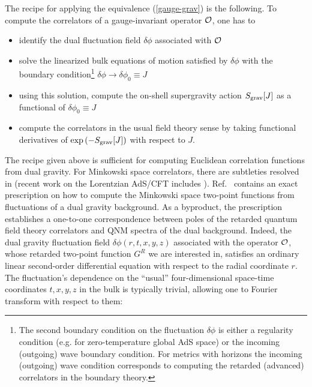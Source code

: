 \documentclass[]{iopart}
\begin{document}
The recipe for applying the equivalence (\ref{gauge-grav}) is the following.
To compute the correlators of a gauge-invariant operator ${\cal O}$, one has
to
%
\begin{itemize}

\item
identify the dual fluctuation field $\delta \phi$ associated with ${\cal O}$

\item
solve the linearized bulk equations of motion satisfied by $\delta \phi$ with
the boundary condition\footnote{The second boundary condition on the
  fluctuation $\delta \phi$ is either a regularity condition (e.g. for
  zero-temperature global AdS space) or the incoming (outgoing) wave boundary
  condition. For metrics with horizons the incoming (outgoing) wave condition
  corresponds to computing the retarded (advanced) correlators in the boundary
  theory.}  $\delta \phi \rightarrow \delta \phi_0 \equiv J$

\item 
using this solution, compute the on-shell supergravity action $S_{\rm
  grav}[J]$ as a functional of $\delta \phi_0 \equiv J$

\item
compute the correlators in the usual field theory sense by taking functional
derivatives of $\exp{(-S_{\rm grav}[J])}$ with respect to $J$.

\end{itemize}
%
The recipe given above is sufficient for computing Euclidean correlation
functions from dual gravity. For Minkowski space correlators, there are
subtleties resolved in \cite{Son:2002sd, Herzog:2002pc} (recent work on the
Lorentzian AdS/CFT includes \cite{Marolf:2004fy, Skenderis:2008dg}).
Ref.~\cite{Son:2002sd} contains an exact prescription on how to compute the
Minkowski space two-point functions from fluctuations of a dual gravity
background. As a byproduct, the prescription establishes a one-to-one
correspondence between poles of the retarded quantum field theory correlators
and QNM spectra of the dual background.
%
Indeed, the dual gravity fluctuation field $\delta \phi (r,t,x,y,z)$
associated with the operator ${\cal O}$, whose retarded two-point function
$G^R$ we are interested in, satisfies an ordinary linear second-order
differential equation with respect to the radial coordinate $r$.  The
fluctuation's dependence on the ``usual'' four-dimensional space-time
coordinates $t,x,y,z$ in the bulk is typically trivial, allowing one to
Fourier transform with respect to them:
\end{document}
